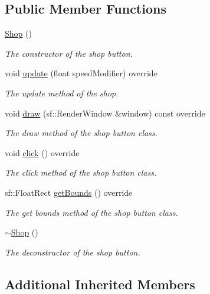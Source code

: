 \subsection*{Public Member Functions}
\begin{DoxyCompactItemize}
\item 
\hyperlink{class_shop_a579ed9f949f7db3f90c22dfe10b25797}{Shop} ()
\begin{DoxyCompactList}\small\item\em The constructor of the shop button. \end{DoxyCompactList}\item 
void \hyperlink{class_shop_a80125375c97c1028281e9458885ac0f0}{update} (float speed\+Modifier) override
\begin{DoxyCompactList}\small\item\em The update method of the shop. \end{DoxyCompactList}\item 
void \hyperlink{class_shop_af20c1357f7b387c9de1a769f247301cc}{draw} (sf\+::\+Render\+Window \&window) const override
\begin{DoxyCompactList}\small\item\em The draw method of the shop button class. \end{DoxyCompactList}\item 
void \hyperlink{class_shop_aa2e219f5db2af725434b94194d34c4a0}{click} () override
\begin{DoxyCompactList}\small\item\em The click method of the shop button class. \end{DoxyCompactList}\item 
sf\+::\+Float\+Rect \hyperlink{class_shop_a09ad28db42d7a8d4ac98065ad8b32e07}{get\+Bounds} () override
\begin{DoxyCompactList}\small\item\em The get bounds method of the shop button class. \end{DoxyCompactList}\item 
\hyperlink{class_shop_a36bf69bdc0da1b7258acc63a5fe89d40}{$\sim$\+Shop} ()
\begin{DoxyCompactList}\small\item\em The deconstructor of the shop button. \end{DoxyCompactList}\end{DoxyCompactItemize}
\subsection*{Additional Inherited Members}


